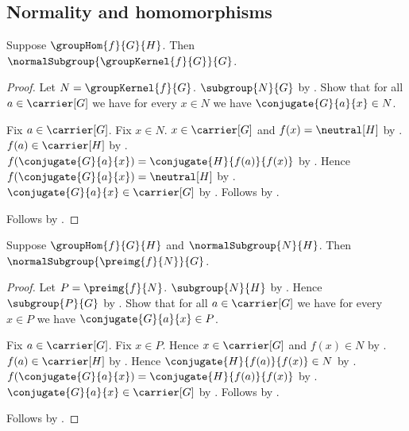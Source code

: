 \subsection{Normality and homomorphisms}

\begin{theorem}\label{group_kernel_normal_subgroup}
    Suppose $\groupHom{f}{G}{H}$.
    Then $\normalSubgroup{\groupKernel{f}{G}}{G}$.
\end{theorem}
\begin{proof}
    Let $N=\groupKernel{f}{G}$.
    $\subgroup{N}{G}$ by .
    Show that for all $a\in\carrier[G]$ we have for every $x\in N$
        we have $\conjugate{G}{a}{x}\in N$.
    \begin{subproof}
        Fix $a\in\carrier[G]$.
        Fix $x\in N$.
        $x\in\carrier[G]$ and $f(x)=\neutral[H]$ by
            .
        $f(a)\in\carrier[H]$ by .
        $f(\conjugate{G}{a}{x})=
            \conjugate{H}{f(a)}{f(x)}$ by
            .
        Hence $f(\conjugate{G}{a}{x})=\neutral[H]$ by
            .
        $\conjugate{G}{a}{x}\in\carrier[G]$ by
            .
        Follows by .
    \end{subproof}
    Follows by .
\end{proof}

\begin{theorem}\label{group_hom_normal_preimage}
    Suppose $\groupHom{f}{G}{H}$ and $\normalSubgroup{N}{H}$.
    Then $\normalSubgroup{\preimg{f}{N}}{G}$.
\end{theorem}
\begin{proof}
    Let $P=\preimg{f}{N}$.
    $\subgroup{N}{H}$ by .
    Hence $\subgroup{P}{G}$ by
        .
    Show that for all $a\in\carrier[G]$ we have for every $x\in P$
        we have $\conjugate{G}{a}{x}\in P$.
    \begin{subproof}
        Fix $a\in\carrier[G]$.
        Fix $x\in P$.
        Hence $x\in\carrier[G]$ and $f(x)\in N$ by
            .
        $f(a)\in\carrier[H]$ by .
        Hence $\conjugate{H}{f(a)}{f(x)}\in N$ by
            .
        $f(\conjugate{G}{a}{x})=
            \conjugate{H}{f(a)}{f(x)}$ by
            .
        $\conjugate{G}{a}{x}\in\carrier[G]$ by
            .
        Follows by .
    \end{subproof}
    Follows by .
\end{proof}

